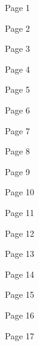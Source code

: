 \documentclass[a4paper]{article}
\begin{document}
Page 1

\pagebreak

Page 2

\pagebreak

Page 3

\pagebreak

Page 4

\pagebreak

Page 5

\pagebreak

Page 6

\pagebreak

Page 7

\pagebreak

Page 8

\pagebreak

Page 9

\pagebreak

Page 10

\pagebreak

Page 11

\pagebreak

Page 12

\pagebreak

Page 13

\pagebreak

Page 14

\pagebreak

Page 15

\pagebreak

Page 16

\pagebreak

Page 17

\pagebreak
\end{document}
